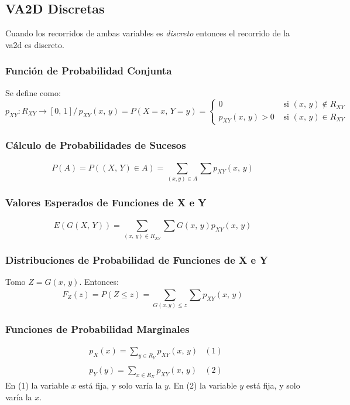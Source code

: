 \documentclass{article}
\newcommand{\comma}{,\,}                                %
\newcommand{\tq}{/\,}                                   %
\newcommand{\sumatoria}[2]{\sum_{#1} ^{#2}}
\begin{document}
\subsection{VA2D Discretas}
Cuando los recorridos de ambas variables es \emph{discreto} entonces el recorrido de la va2d es discreto.

\subsubsection{Función de Probabilidad Conjunta}
Se define como:
\begin{equation*}
    p_{XY}: R_{XY} \rightarrow [0 \comma 1 ] \tq p_{XY}(x \comma y) = P(X = x \comma Y = y) = \left\{ \begin{array}{lcc}
         0& \text{ si } (x \comma y) \notin R_{XY}  \\
         p_{XY}(x \comma y) > 0&  \text{ si } (x \comma y) \in R_{XY}
    \end{array} 
    \right.
\end{equation*}

\subsubsection{Cálculo de Probabilidades de Sucesos}
\begin{equation*}
    P(A) = P((X\comma Y) \in A) = \sumatoria{(x,y) \in A}{} \sumatoria{}{} p_{XY}(x \comma y)
\end{equation*}

\subsubsection{Valores Esperados de Funciones de X e Y}
\begin{equation*}
    E(G(X \comma Y)) = \sumatoria{(x \comma y) \in R_{XY}}{} \sumatoria{}{} G(x \comma y) p_{XY}(x \comma y)
\end{equation*}

\subsubsection{Distribuciones de Probabilidad de Funciones de X e Y}
Tomo $Z = G(x \comma y)$. Entonces:
\begin{equation*}
    F_Z(z) = P(Z \leq z) = \sumatoria{G(x,y) \leq z}{} \sumatoria{}{} p_{XY}(x \comma y)
\end{equation*}

\subsubsection{Funciones de Probabilidad Marginales}
\begin{equation*}
    \begin{array}{lcc}
     & p_X(x) = \sumatoria{y \in R_Y}{} p_{XY}(x \comma y)  &(1)\\
     \\
     & p_Y(y) = \sumatoria{x \in R_X}{} p_{XY}(x \comma y)  &(2)
\end{array}
\end{equation*}
En (1) la variable $x$ está fija, y solo varía la $y$. En (2) la variable $y$ está fija, y solo varía la $x$.
\end{document}
